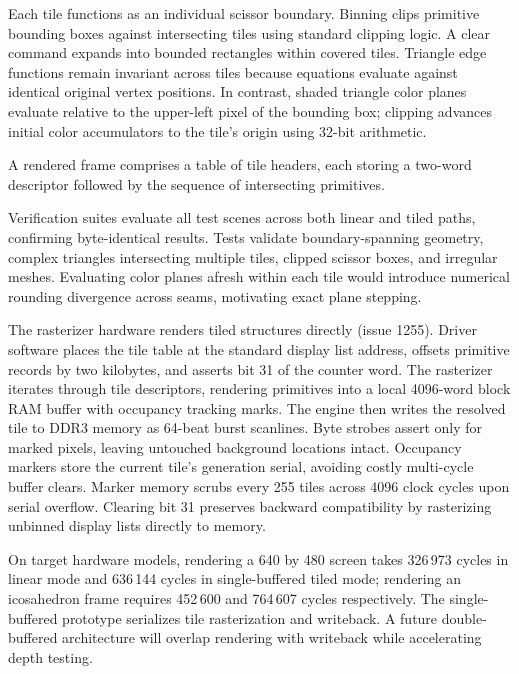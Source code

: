 \documentclass[journal,9pt]{IEEEtran}
\newcommand{\tilepart}[3]{%
}
\begin{document}
Each tile functions as an individual scissor boundary. Binning clips
primitive bounding boxes against intersecting tiles using standard clipping
logic. A clear command expands into bounded rectangles within covered tiles.
Triangle edge functions remain invariant across tiles because equations
evaluate against identical original vertex positions. In contrast, shaded
triangle color planes evaluate relative to the upper-left pixel of the
bounding box; clipping advances initial color accumulators to the tile's
origin using 32-bit arithmetic.

\tilepart{entry}{An entry clipped to a tile: a clear becomes a
rectangle, and a shaded triangle's planes are stepped to the tile's
first pixel.}{lst:g-tile-entry}

A rendered frame comprises a table of tile headers, each storing a
two-word descriptor followed by the sequence of intersecting primitives.

\tilepart{format}{The tile table definition from \code{razboj\_tile}.}{lst:g-tile-format}

Verification suites evaluate all test scenes across both linear and tiled
paths, confirming byte-identical results. Tests validate boundary-spanning
geometry, complex triangles intersecting multiple tiles, clipped scissor
boxes, and irregular meshes. Evaluating color planes afresh within each tile
would introduce numerical rounding divergence across seams, motivating exact
plane stepping.

The rasterizer hardware renders tiled structures directly (issue 1255).
Driver software places the tile table at the standard display list address,
offsets primitive records by two kilobytes, and asserts bit 31 of the
counter word. The rasterizer iterates through tile descriptors, rendering
primitives into a local 4096-word block RAM buffer with occupancy tracking
marks. The engine then writes the resolved tile to DDR3 memory as 64-beat
burst scanlines. Byte strobes assert only for marked pixels, leaving
untouched background locations intact. Occupancy markers store the current
tile's generation serial, avoiding costly multi-cycle buffer clears. Marker
memory scrubs every 255 tiles across 4096 clock cycles upon serial overflow.
Clearing bit 31 preserves backward compatibility by rasterizing unbinned
display lists directly to memory.

On target hardware models, rendering a 640 by 480 screen takes 326\,973
cycles in linear mode and 636\,144 cycles in single-buffered tiled mode;
rendering an icosahedron frame requires 452\,600 and 764\,607 cycles
respectively. The single-buffered prototype serializes tile rasterization
and writeback. A future double-buffered architecture will overlap rendering
with writeback while accelerating depth testing.
\end{document}
